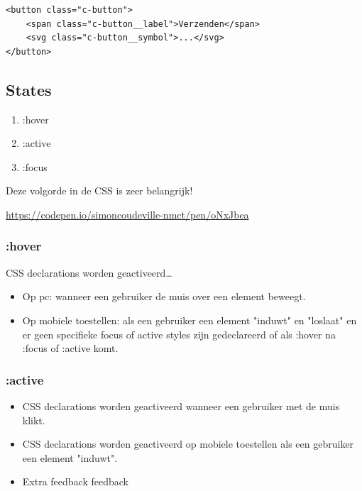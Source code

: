 \documentclass{article}
\begin{document}
\begin{verbatim}
<button class="c-button">
    <span class="c-button__label">Verzenden</span>
    <svg class="c-button__symbol">...</svg>
</button>
\end{verbatim}

\subsection{States}
\begin{enumerate}
    \item :hover
    \item :active
    \item :focus
\end{enumerate}

Deze volgorde in de CSS is zeer belangrijk!

\url{https://codepen.io/simoncoudeville-nmct/pen/oNxJbea}

\subsubsection{:hover}

CSS declarations worden geactiveerd\dots

\begin{itemize}
    \item Op pc: wanneer een gebruiker de muis over een element beweegt.
    \item Op mobiele toestellen: als een gebruiker een element "induwt" en "loslaat" en er geen specifieke focus of active styles zijn gedeclareerd of als :hover na :focus of :active komt.
\end{itemize}

\subsubsection{:active}

\begin{itemize}
    \item CSS declarations worden geactiveerd wanneer een gebruiker met de muis klikt.
    \item CSS declarations worden geactiveerd op mobiele toestellen als een gebruiker een element "induwt".
    \item Extra feedback feedback
\end{itemize}
\end{document}
